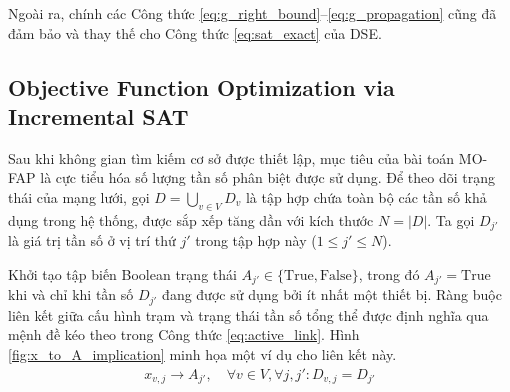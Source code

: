 \documentclass[letterpaper,journal]{IEEEtran}
\begin{document}

Ngoài ra, chính các Công thức \eqref{eq:g_right_bound}--\eqref{eq:g_propagation} cũng đã đảm bảo và thay thế cho Công thức \eqref{eq:sat_exact} của DSE.


\subsection{Objective Function Optimization via Incremental SAT}
\label{subsec:incremental_sat}
Sau khi không gian tìm kiếm cơ sở được thiết lập, mục tiêu của bài toán MO-FAP là cực tiểu hóa số lượng tần số phân biệt được sử dụng. Để theo dõi trạng thái của mạng lưới, gọi $D = \bigcup_{v \in V} D_v$ là tập hợp chứa toàn bộ các tần số khả dụng trong hệ thống, được sắp xếp tăng dần với kích thước $N = |D|$. Ta gọi $D_{j'}$ là giá trị tần số ở vị trí thứ $j'$ trong tập hợp này ($1 \le j' \le N$).

Khởi tạo tập biến Boolean trạng thái $A_{j'} \in \{\text{True}, \text{False}\}$, trong đó $A_{j'} = \text{True}$ khi và chỉ khi tần số $D_{j'}$ đang được sử dụng bởi ít nhất một thiết bị. Ràng buộc liên kết giữa cấu hình trạm và trạng thái tần số tổng thể được định nghĩa qua mệnh đề kéo theo trong Công thức \eqref{eq:active_link}. Hình \ref{fig:x_to_A_implication} minh họa một ví dụ cho liên kết này.
\begin{align}
    x_{v,j} \rightarrow A_{j'}, \quad \forall v \in V, \forall j, j' : D_{v,j} = D_{j'} \label{eq:active_link}
\end{align}
\end{document}
